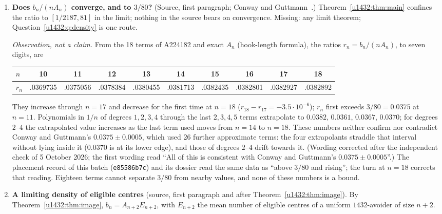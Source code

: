 \documentclass[11pt]{article}
\theoremstyle{remark}\newtheorem{remark}[theorem]{Remark}
\newcommand{\file}[1]{\nolinkurl{#1}}
\begin{document}
\begin{enumerate}
\item\label{u1432:q:limit} \textbf{Does $b_n/(nA_n)$ converge, and to
 $3/80$?} (Source, first paragraph; Conway and Guttmann~\cite[Section~5.3]{CG}.)
 Theorem~\ref{u1432:thm:main} confines the ratio to $[1/2187,81]$ in the
 limit; nothing in the source bears on convergence. Missing: any limit
 theorem; Question~\ref{u1432:q:density} is one route.

 \emph{Observation, not a claim.} From the 18 terms of A224182 and exact
 $A_n$ (hook-length formula), the ratios $r_n=b_n/(nA_n)$, to seven digits,
 are
 \begin{center}\small\setlength{\tabcolsep}{3.5pt}
 \begin{tabular}{@{}lccccccccc@{}}\toprule
 $n$ & 10 & 11 & 12 & 13 & 14 & 15 & 16 & 17 & 18\\\midrule
 $r_n$ & .0369735 & .0375056 & .0378384 & .0380455 & .0381713 & .0382435 & .0382801 & .0382927 & .0382892\\
 \bottomrule\end{tabular}
 \end{center}
 They increase through $n=17$ and decrease for the first time at $n=18$
 ($r_{18}-r_{17}=-3.5\cdot10^{-6}$); $r_n$ first exceeds $3/80=0.0375$ at
 $n=11$. Polynomials in $1/n$ of degrees $1,2,3,4$ through the last
 $2,3,4,5$ terms extrapolate to $0.0382$, $0.0361$, $0.0367$, $0.0370$; for
 degrees $2$--$4$ the extrapolated value increases as the last term used
 moves from $n=14$ to $n=18$. These numbers neither confirm nor contradict
 Conway and Guttmann's $0.0375\pm0.0005$, which used 26 further approximate
 terms: the four extrapolants straddle that interval without lying inside it
 ($0.0370$ is at its lower edge), and those of degrees $2$--$4$ drift towards
 it. \textup{(Wording corrected after the independent check of 5 October 2026; the first wording read ``All of this is consistent with Conway and Guttmann's $0.0375\pm0.0005$''.)} The placement record of this batch
 (\file{e85586b7c}) and its dossier read the same data as ``above $3/80$ and
 rising''; the turn at $n=18$ corrects that reading. Eighteen terms cannot
 separate $3/80$ from nearby values, and none of these numbers is a bound.
\item\label{u1432:q:density} \textbf{A limiting density of eligible
 centres} (source, first paragraph and after Theorem~\ref{u1432:thm:image}).
 By Theorem~\ref{u1432:thm:image}, $b_n=A_{n+2}E_{n+2}$, with $E_{n+2}$ the
 mean number of eligible centres of a uniform $1432$-avoider of size $n+2$.

\end{enumerate}
\end{document}
